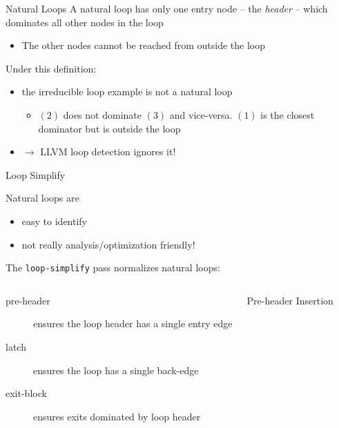 \begin{frame}{Natural Loops}
A natural loop has only one entry node -- the \emph{header} -- which dominates all other nodes in the loop
\begin{itemize}
\item The other nodes cannot be reached from outside the loop
\end{itemize}

\vfill
Under this definition:

\begin{itemize}
\item the irreducible loop example is not a natural loop
\begin{itemize}
\item $(2)$ does not dominate $(3)$ and vice-versa. $(1)$ is the closest dominator but is outside the loop
\end{itemize}
\item $\rightarrow$ LLVM loop detection ignores it!
\end{itemize}
\end{frame}


\begin{frame}{Loop Simplify}

Natural loops are

\begin{itemize}
\item easy to \alert{identify}
\item not really analysis/optimization friendly!
\end{itemize}

\vfill
The \texttt{loop-simplify} pass normalizes natural loops:

\begin{columns}[t]
\begin{description}
\item[pre-header] ensures the \alert{loop header} has \alert{a single entry edge}
\item[latch] ensures the loop has \alert{a single back-edge}
\item[exit-block] ensures \alert{exits dominated} by loop \alert{header}
\end{description}

\vspace{-1em}
\begin{block}{Pre-header Insertion}
\centering

\end{block}
\end{columns}
\end{frame}


